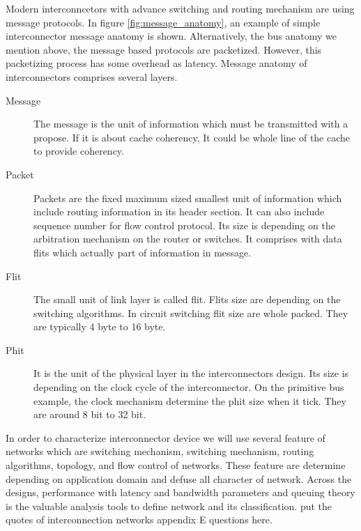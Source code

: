 Modern interconncetors with advance switching and routing mechanism are using message protocols.  In figure \ref{fig:message_anatomy}, an example of simple interconnector message anatomy is shown. Alternatively, the bus anatomy we mention above, the message based protocols are packetized. However, this packetizing process has some overhead as latency\cite{ComputerArchCoursera}. Message anatomy of interconnectors comprises several layers\cite{0122007514}.
\begin{description}
\item[Message]The message is the unit of information which must be transmitted with a propose. If it is about cache coherency, It could be whole line of the cache to provide coherency.
\item[Packet]Packets are the fixed maximum sized  smallest unit of information which include routing information in its header section. It can also include sequence number for flow control protocol. Its size is depending on the arbitration mechanism on the router or switches. It comprises with data flits which actually part of information in message.
\item[Flit]The small unit of link layer is called flit. Flits size are depending on the switching algorithms. In circuit switching flit size are whole packed. They are typically 4 byte to 16 byte.
\item[Phit]It is the unit of the physical layer in the interconnectors design. Its size is depending on the clock cycle of the interconnector. On the primitive bus example, the clock mechanism determine the phit size when it tick. They are around 8 bit to 32 bit.
\end{description}
 In order to characterize interconnector device we will use several feature of networks which are switching mechanism, switching mechanism, routing algorithms, topology, and flow control of networks. These feature are determine depending on application domain and defuse all character of network. Across the designs, performance with latency and bandwidth parameters and queuing theory is the valuable analysis tools to define network and its classification\cite{hennessy2012computer}.
\todo[inline] put the quotes of interconnection networks appendix E questions here.
